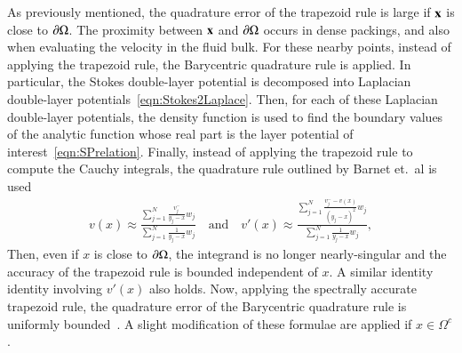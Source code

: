 \documentclass[preprint, 10pt]{elsarticle}
\begin{document}
As previously mentioned, the quadrature error of the trapezoid rule is
large if ${\mathbf{x}}$ is close to ${\partial}\Omega$.  The proximity between ${\mathbf{x}}$ and
${\partial}\Omega$ occurs in dense packings, and also when evaluating the
velocity in the fluid bulk.  For these nearby points, instead of
applying the trapezoid rule, the Barycentric quadrature rule is applied.
In particular, the Stokes double-layer potential is decomposed into
Laplacian double-layer potentials~\eqref{eqn:Stokes2Laplace}.  Then, for
each of these Laplacian double-layer potentials, the density function is
used to find the boundary values of the analytic function whose real
part is the layer potential of interest~\eqref{eqn:SPrelation}.
Finally, instead of applying the trapezoid rule to compute the Cauchy
integrals, the quadrature rule outlined by Barnet et.~al is used
\begin{align}
  v(x) \approx \frac{\sum\limits_{j=1}^N \frac{v_j^-}{y_j-x}w_j}
    {\sum\limits_{j=1}^N \frac{1}{y_j-x}w_j}
  \quad \text{and} \quad
  v'(x) \approx \frac{\sum\limits_{j=1}^N 
    \frac{v_j^- - v(x)}{(y_j - x)^2}w_j}
    {\sum\limits_{j=1}^N \frac{1}{y_j-x}w_j}, 
  \label{eqn:vvpQuadrature}
\end{align}
Then, even if $x$ is close to ${\partial}\Omega$, the integrand is no longer
nearly-singular and the accuracy of the trapezoid rule is bounded
independent of $x$.  A similar identity identity involving $v'(x)$ also
holds.   Now, applying the spectrally accurate trapezoid rule, the
quadrature error of the Barycentric quadrature rule
is uniformly bounded~\cite{bar-wu-vee2015}.  A slight modification of
these formulae are applied if $x \in \Omega^{c}$.

\end{document}
